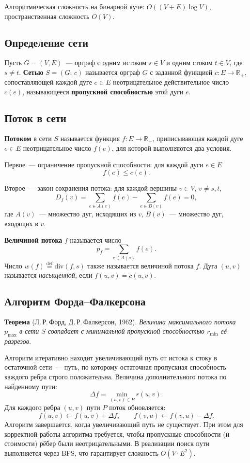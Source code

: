 Алгоритмическая сложность на бинарной куче:
$O((V + E)\log{V})$, пространственная сложность $O(V)$.

\subsection{Определение сети}
Пусть $G = (V, E)$~--- орграф с одним истоком $s \in V$ и одним стоком
$t \in V$, где $s \neq t$. \textbf{Сетью} $S = (G;\, c)$ называется орграф
$G$ с заданной функцией $c : E \to \mathbb{R}_+$, сопоставляющей каждой
дуге $e \in E$ неотрицательное действительное число $c(e)$, называющееся
\textbf{пропускной способностью} этой дуги $e$.

\subsection{Поток в сети}
\textbf{Потоком} в сети $S$ называется функция $f : E \to \mathbb{R}_+$,
приписывающая каждой дуге $e \in E$ неотрицательное число $f(e)$,
для которой выполняются два условия.

Первое~--- ограничение пропускной способности: для каждой дуги $e \in E$
\[
    f(e) \leqslant c(e).
\]

Второе~--- закон сохранения потока: для каждой вершины $v \in V$,
$v \neq s, t$,
\[
    D_f(v) = \sum_{e \in A(v)} f(e) - \sum_{e \in B(v)} f(e) = 0,
\]
где $A(v)$~--- множество дуг, исходящих из $v$,
$B(v)$~--- множество дуг, входящих в $v$.

\textbf{Величиной потока} $f$ называется число
\[
    p_f = \sum_{e \in A(s)} f(e).
\]
Число $w(f) \stackrel{\mathrm{def}}{=} \mathrm{div}(f, s)$ также называется
величиной потока $f$. Дуга $(u, v)$ называется \textit{насыщенной},
если $f(u, v) = c(u, v)$.

\subsection{Алгоритм Форда--Фалкерсона}

\textbf{Теорема} (Л.\,Р.\,Форд, Д.\,Р.\,Фалкерсон, 1962).
\textit{Величина максимального потока $p_{\max}$ в сети $S$ совпадает
с минимальной пропускной способностью $r_{\min}$ её разрезов.}

Алгоритм итеративно находит увеличивающий путь от истока к стоку
в остаточной сети~--- путь, по которому остаточная пропускная
способность каждого ребра строго положительна. Величина
дополнительного потока по найденному пути:
\[
    \Delta f = \min_{(u,v) \in P} r(u,v).
\]
Для каждого ребра $(u,v)$ пути $P$ поток обновляется:
\[
    f(u,v) \leftarrow f(u,v) + \Delta f, \qquad
    f(v,u) \leftarrow f(v,u) - \Delta f.
\]
Алгоритм завершается, когда увеличивающий путь не существует.
При этом для корректной работы алгоритма требуется, чтобы пропускные способности (и стоимости) рёбер были неотрицательными.
В реализации поиск пути выполняется через BFS, что гарантирует сложность $O(V \cdot E^2)$.

